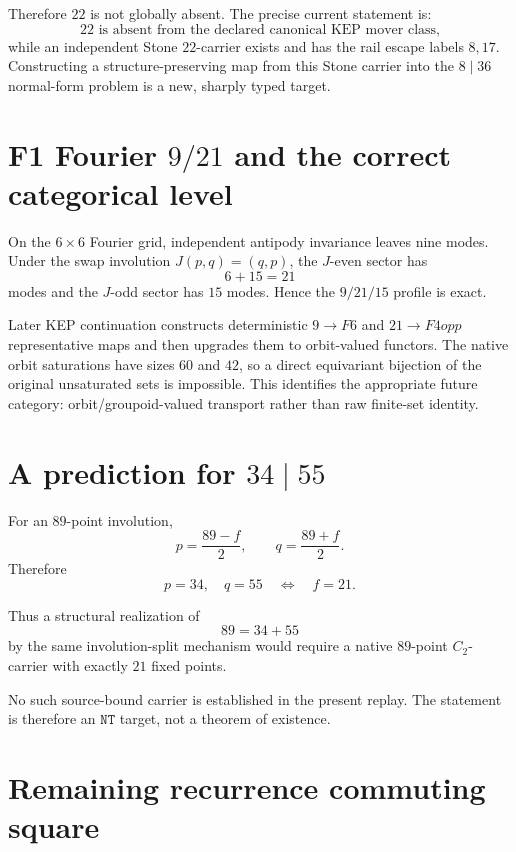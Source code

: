 \documentclass[11pt,a4paper]{article}
\newcommand{\NT}{\texttt{NT}}
\begin{document}
Therefore \(22\) is not globally absent.  The precise current statement
is:
\[
\boxed{
22\text{ is absent from the declared canonical KEP mover class,}
}
\]
while an independent Stone \(22\)-carrier exists and has the rail
escape labels \(8,17\).  Constructing a structure-preserving map from
this Stone carrier into the \(8\mid36\) normal-form problem is a new,
sharply typed target.

\section{F1 Fourier \(9/21\) and the correct categorical level}

On the \(6\times6\) Fourier grid, independent antipody invariance leaves
nine modes.  Under the swap involution \(J(p,q)=(q,p)\), the
\(J\)-even sector has
\[
6+15=21
\]
modes and the \(J\)-odd sector has \(15\) modes.  Hence the
\(9/21/15\) profile is exact.

Later KEP continuation constructs deterministic \(9\to F6\) and
\(21\to F4opp\) representative maps and then upgrades them to
orbit-valued functors.  The native orbit saturations have sizes
\(60\) and \(42\), so a direct equivariant bijection of the original
unsaturated sets is impossible.  This identifies the appropriate
future category: orbit/groupoid-valued transport rather than raw
finite-set identity.

\section{A prediction for \(34\mid55\)}

For an \(89\)-point involution,
\[
p=\frac{89-f}{2},\qquad
q=\frac{89+f}{2}.
\]
Therefore
\[
\boxed{
p=34,\quad q=55
\quad\Longleftrightarrow\quad
f=21.
}
\]

Thus a structural realization of
\[
89=34+55
\]
by the same involution-split mechanism would require a native
\(89\)-point \(C_2\)-carrier with exactly \(21\) fixed points.

No such source-bound carrier is established in the present replay.
The statement is therefore an \(\NT\) target, not a theorem of
existence.

\section{Remaining recurrence commuting square}
\end{document}
